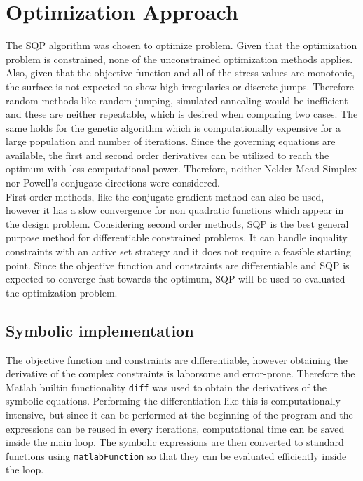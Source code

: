 \section{Optimization Approach}
The SQP algorithm was chosen to optimize problem. 
Given that the optimization problem is constrained, none of the unconstrained optimization methods applies.
Also, given that the objective function and all of the stress values are monotonic, the surface is not expected to show high irregularies or discrete jumps. Therefore random methods like random jumping, simulated annealing would be inefficient and these are neither repeatable, which is desired when comparing two cases. The same holds for the genetic algorithm which is computationally expensive for a large population and number of iterations.
Since the governing equations are available, the first and second order derivatives can be utilized to reach the optimum with less computational power. Therefore, neither Nelder-Mead Simplex nor Powell’s conjugate directions were considered.\\

First order methods, like the conjugate gradient method can also be used, however it has a slow convergence for non quadratic functions which appear in the design problem. Considering second order methods, SQP is the best general purpose method for differentiable constrained problems. It can handle inquality constraints with an active set strategy and it does not require a feasible starting point. Since the objective function and constraints are differentiable and SQP is expected to converge fast towards the optimum, SQP will be used to evaluated the optimization problem.
 



\subsection{Symbolic implementation}

\newcommand{\xvec}{\mathbf{x}}
\newcommand{\hvec}{\mathbf{h}}
\newcommand{\gvec}{\mathbf{g}}
\newcommand{\Wmat}{\mathbf{W}}
\newcommand{\Amat}{\mathbf{A}}
\newcommand{\lamvec}{\bm{\lambda}}

The objective function and constraints are differentiable, however obtaining the derivative of the complex constraints is laborsome and error-prone.
Therefore the Matlab builtin functionality \verb|diff| was used to obtain the derivatives of the symbolic equations.
Performing the differentiation like this is computationally intensive, but since it can be performed at the beginning of the program and the expressions can be reused in every iterations, computational time can be saved inside the main loop.
The symbolic expressions are then converted to standard functions using \verb|matlabFunction| so that they can be evaluated efficiently inside the loop.

